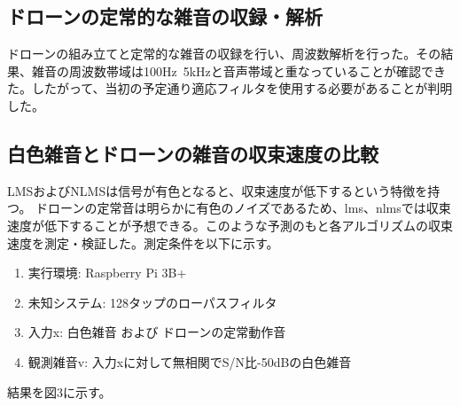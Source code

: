 \documentclass[a4paper]{ltjsarticle}
\begin{document}
  \subsection{ドローンの定常的な雑音の収録・解析}
    ドローンの組み立てと定常的な雑音の収録を行い、周波数解析を行った。その結果、雑音の周波数帯域は100Hz~5kHzと音声帯域と重なっていることが確認できた。したがって、当初の予定通り適応フィルタを使用する必要があることが判明した。

  \subsection{白色雑音とドローンの雑音の収束速度の比較}
    LMSおよびNLMSは信号が有色となると、収束速度が低下するという特徴を持つ。
    ドローンの定常音は明らかに有色のノイズであるため、lms、nlmsでは収束速度が低下することが予想できる。このような予測のもと各アルゴリズムの収束速度を測定・検証した。測定条件を以下に示す。

    \begin{enumerate}
      \renewcommand{\labelenumi}{(\arabic{enumi})}
      \item 実行環境: Raspberry Pi 3B+
      \item 未知システム: 128タップのローパスフィルタ
      \item 入力x: 白色雑音 および ドローンの定常動作音
      \item 観測雑音v: 入力xに対して無相関でS/N比-50dBの白色雑音
    \end{enumerate}  

    結果を図3に示す。
    

    
    
  



\end{document}
